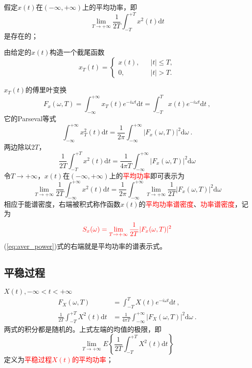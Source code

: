 \documentclass[12pt,a4paper]{article}
\newcommand{\dif}{\mathrm{d}}
\begin{document}
假定$x(t)$在$(-\infty, +\infty)$上的平均功率，即
\begin{equation}
\lim_{T\rightarrow +\infty} \frac{1}{2T} \int_{-T}^{+T} x^2(t) \dif t 
\end{equation}
是存在的；

由给定的$x(t)$构造一个截尾函数
\begin{equation}
x_T(t) = \left\{
\begin{aligned}
x(t),  & & |t| \leqslant T, \\
0,  & & |t| > T.
\end{aligned}
\right.
\end{equation}

$x_T(t)$的傅里叶变换
\begin{equation}
F_x(\omega, T) = \int_{-\infty}^{+\infty} x_T(t) e^{-i\omega t} \dif t = \int_{-T}^{T} x(t) e^{-i\omega t} \dif t ~,
\end{equation}
它的Parseval等式
\begin{equation}
\int_{-\infty}^{+\infty} x^2_T(t) \dif t = \frac{1}{2\pi} \int_{-\infty}^{+\infty} |F_x(\omega, T)|^2 \dif \omega ~.
\end{equation}
两边除以$2T$，
\begin{equation}
\frac{1}{2T}\int_{-T}^{+T} x^2(t) \dif t = \frac{1}{4\pi T} \int_{-\infty}^{+\infty} |F_x(\omega, T)|^2 \dif \omega
\end{equation}
令$T\rightarrow +\infty$，$x(t)$在$(-\infty, +\infty)$上的\textcolor{red}{平均功率}即可表示为
\begin{equation}
\lim_{T\rightarrow +\infty} \frac{1}{2T}\int_{-\infty}^{+\infty} x^2(t) \dif t = \frac{1}{2\pi} \int_{-\infty}^{+\infty} \lim_{T\rightarrow +\infty} \frac{1}{2T} |F_x(\omega, T)|^2 \dif \omega
\label{eq:aver_power}
\end{equation}
相应于能谱密度，右端被积式称作函数$x(t)$的\textcolor{red}{平均功率谱密度}、\textcolor{red}{功率谱密度}，记为
\begin{equation}
\color{red} S_x(\omega) = \lim_{T\rightarrow +\infty} \frac{1}{2T} |F_x(\omega, T)|^2
\end{equation}
(\ref{eq:aver_power})式的右端就是平均功率的谱表示式。



\subsection{平稳过程}
$X(t), -\infty < t < +\infty$
\begin{align}
F_X(\omega, T) &= \int_{-T}^{T} X(t) e^{-i\omega t} \dif t  ~, \\
\frac{1}{2T}\int_{-T}^{+T} X^2(t) \dif t &= \frac{1}{4\pi T} \int_{-\infty}^{+\infty} |F_X(\omega, T)|^2 \dif \omega ~.
\end{align}
两式的积分都是随机的。上式左端的均值的极限，即
\begin{equation}
\lim_{T\rightarrow +\infty} E\left \{ \frac{1}{2T}\int_{-T}^{+T} X^2(t) \dif t \right \}
\end{equation}
定义为\textcolor{red}{平稳过程$X(t)$的平均功率}；
\end{document}
